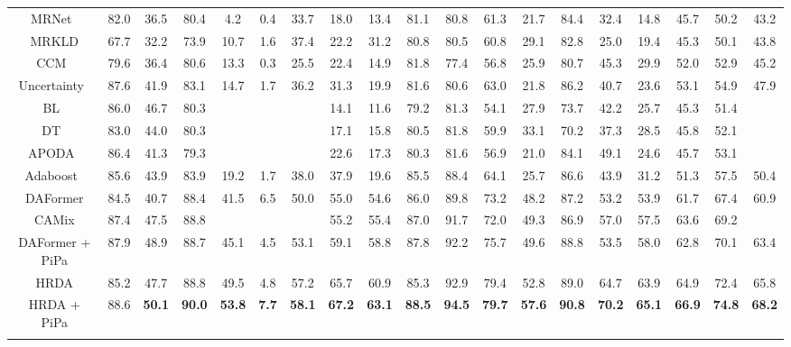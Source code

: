 \documentclass[10pt,twocolumn,letterpaper]{article}
\begin{document}
\begin{table*}[!t]
{\begin{tabular}{c|cccccccccccccccc|c|c}
		MRNet~\cite{zheng2019unsupervised} & 82.0 & 36.5 & 80.4 & 4.2 & 0.4 & 33.7 & 18.0 & 13.4 & 81.1 & 80.8 & 61.3 & 21.7 & 84.4 & 32.4 & 14.8 & 45.7 & 50.2 & 43.2 \\
		MRKLD \cite{zou2019confidence} & 67.7 & 32.2 & 73.9 & 10.7 & 1.6 & 37.4 & 22.2 & 31.2 & 80.8 & 80.5 & 60.8 & 29.1 & 82.8 & 25.0 & 19.4 & 45.3 & 50.1 & 43.8 \\
		CCM~\cite{li2020content} & 79.6 & 36.4 & 80.6 & 13.3 & 0.3 & 25.5 & 22.4 & 14.9 & 81.8 & 77.4 & 56.8 & 25.9 & 80.7 & 45.3 & 29.9 &  52.0 & 52.9 & 45.2 \\
		Uncertainty~\cite{zheng2021rectifying} & 87.6 & 41.9 & 83.1 & 14.7 & 1.7 & 36.2 & 31.3 & 19.9 & 81.6 & 80.6 & 63.0 & 21.8 & 86.2 & 40.7 & 23.6 & 53.1 & 54.9 & 47.9 \\
		BL~\cite{li2019bidirectional} & 86.0 & 46.7 & 80.3 &  &  &  & 14.1 & 11.6 & 79.2 & 81.3 & 54.1 & 27.9 & 73.7 & 42.2 & 25.7 & 45.3 & 51.4 &  \\
		DT~\cite{wang2020differential} & 83.0 & 44.0 & 80.3 &  &  &  & 17.1 & 15.8 & 80.5 & 81.8 & 59.9 & 33.1 & 70.2 & 37.3 & 28.5 & 45.8 & 52.1 &   \\
		APODA~\cite{yang2020adversarial} & 86.4 & 41.3 & 79.3 &  &  &  & 22.6 & 17.3 & 80.3 & 81.6 & 56.9 & 21.0 & 84.1 & 49.1 & 24.6 & 45.7 & 53.1 &   \\
Adaboost~\cite{zheng2022adaptive} & 85.6 & 43.9 & 83.9 & 19.2 & 1.7 & 38.0 & 37.9 & 19.6 & 85.5 & 88.4 & 64.1 & 25.7 & 86.6 & 43.9 & 31.2 & 51.3 & 57.5 & 50.4 \\
\hline
		DAFormer \cite{hoyer2022daformer} & 84.5 & 40.7 & 88.4 & 41.5 & 6.5 & 50.0 & 55.0 & 54.6 & 86.0 & 89.8 & 73.2 & 48.2 & 87.2 & 53.2 & 53.9 & 61.7 & 67.4 & 60.9 \\
        CAMix \cite{zhou2022context} & 87.4 & 47.5 & 88.8 &  &  &  & 55.2 & 55.4 & 87.0 & 91.7 & 72.0 & 49.3 & 86.9 & 57.0 & 57.5 & 63.6 & 69.2 &  \\
\rowcolor{lightgray} 
		DAFormer \cite{hoyer2022daformer} + PiPa & 87.9 & 48.9 & 88.7 & 45.1 & 4.5 & 53.1 & 59.1 & 58.8 & 87.8 & 92.2 & 75.7 & 49.6 & 88.8 & 53.5 & 58.0 & 62.8 & 70.1 & 63.4 \\
		\hline
        HRDA \cite{hoyer2022hrda} & 85.2 & 47.7 & 88.8 & 49.5 & 4.8 & 57.2 & 65.7 & 60.9 & 85.3 & 92.9 & 79.4 & 52.8 & 89.0 & 64.7 & 63.9 & 64.9 & 72.4 & 65.8 \\
\rowcolor{lightgray} 
        HRDA \cite{hoyer2022hrda} + PiPa & 88.6 & \textbf{50.1} & \textbf{90.0} & \textbf{53.8} & \textbf{7.7} & \textbf{58.1} & \textbf{67.2} & \textbf{63.1} & \textbf{88.5} & \textbf{94.5} & \textbf{79.7} & \textbf{57.6} & \textbf{90.8} & \textbf{70.2} & \textbf{65.1} & \textbf{66.9} & \textbf{74.8} & \textbf{68.2} \\


\shline
	\end{tabular}
	}
\end{table*}
\end{document}
